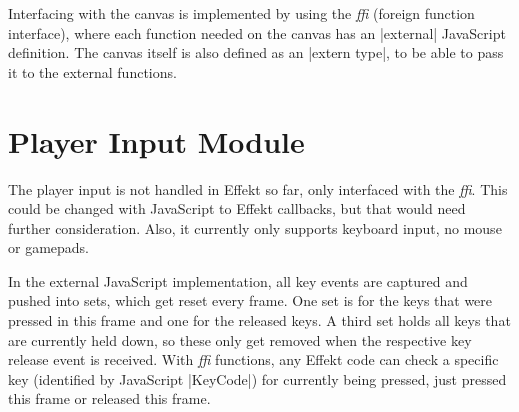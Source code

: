 Interfacing with the canvas is implemented by using the \textit{ffi} (foreign function interface), where each function needed on the canvas has an |external| JavaScript definition. The canvas itself is also defined as an |extern type|, to be able to pass it to the external functions.

\section{Player Input Module}

The player input is not handled in Effekt so far, only interfaced with the \textit{ffi}. This could be changed with JavaScript to Effekt callbacks, but that would need further consideration. Also, it currently only supports keyboard input, no mouse or gamepads.

In the external JavaScript implementation, all key events are captured and pushed into sets, which get reset every frame. One set is for the keys that were pressed in this frame and one for the released keys. A third set holds all keys that are currently held down, so these only get removed when the respective key release event is received. With \textit{ffi} functions, any Effekt code can check a specific key (identified by JavaScript |KeyCode|) for currently being pressed, just pressed this frame or released this frame.
